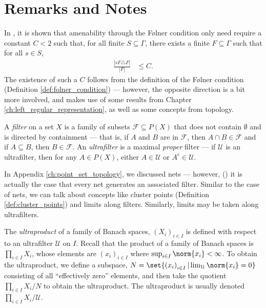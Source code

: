 \section{Remarks and Notes}%
In \cite[Appendix A.3]{juschenko_amenability}, it is shown that amenability through the Følner condition only need require a constant $C < 2$ such that, for all finite $S\subseteq \Gamma$, there exists a finite $F\subseteq \Gamma$ such that for all $s\in S$,
\begin{align*}
  \frac{\left\vert sF\triangle F \right\vert}{\left\vert F \right\vert} &\leq C.
\end{align*}
The existence of such a $C$ follows from the definition of the Følner condition (Definition \ref{def:folner_condition}) --- however, the opposite direction is a bit more involved, and makes use of some results from Chapter \ref{ch:left_regular_representation}, as well as some concepts from topology.\newline

A \textit{filter} on a set $X$ is a family of subsets $\mathcal{F}\subseteq P(X)$ that does not contain $\emptyset$ and is directed by containment --- that is, if $A$ and $B$ are in $\mathcal{F}$, then $A\cap B\in \mathcal{F}$ and if $A\subseteq B$, then $B\in \mathcal{F}$. An \textit{ultrafilter} is a maximal \textit{proper} filter --- if $\mathcal{U}$ is an ultrafilter, then for any $A\in P(X)$, either $A\in \mathcal{U}$ or $A^{c}\in \mathcal{U}$.\newline

In Appendix \ref{ch:point_set_topology}, we discussed nets --- however, (\cite[Theorem 2.25]{aliprantis_infinite_dimensional_analysis}) it is actually the case that every net generates an associated filter. Similar to the case of nets, we can talk about concepts like cluster points (Definition \ref{def:cluster_points}) and limits along filters. Similarly, limits may be taken along ultrafilters.\newline

The \textit{ultraproduct} of a family of Banach spaces, $\left( X_i \right)_{i\in I}$ is defined with respect to an ultrafilter $\mathcal{U}$ on $I$. Recall that the product of a family of Banach spaces is $\prod_{i\in I}X_i$, whose elements are $\left( x_i \right)_{i\in I}$ where $\sup_{i\in I}\norm{x_i} < \infty$. To obtain the ultraproduct, we define a subspace, $N = \set{\left( x_i \right)_{i\in I} | \lim_{\mathcal{U}}\norm{x_i} = 0}$ consisting of all ``effectively zero'' elements, and then take the quotient $\prod_{i\in I}X_i/N$ to obtain the ultraproduct. The ultraproduct is usually denoted $\prod_{i\in I}X_i/\mathcal{U}$.\newline

